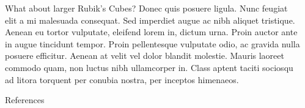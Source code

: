 \documentclass[final]{beamer}
\newlength{\sepwidth}
\newlength{\colwidth}
\newcommand{\separatorcolumn}{\begin{column}{\sepwidth}\end{column}}
\begin{document}
\begin{frame}[t]
\begin{columns}[t]
\begin{column}{\colwidth}
\begin{block}{What about larger Rubik's Cubes?}
    Donec quis posuere ligula. Nunc feugiat elit a mi malesuada consequat. Sed
    imperdiet augue ac nibh aliquet tristique. Aenean eu tortor vulputate,
    eleifend lorem in, dictum urna. Proin auctor ante in augue tincidunt
    tempor. Proin pellentesque vulputate odio, ac gravida nulla posuere
    efficitur. Aenean at velit vel dolor blandit molestie. Mauris laoreet
    commodo quam, non luctus nibh ullamcorper in. Class aptent taciti sociosqu
    ad litora torquent per conubia nostra, per inceptos himenaeos.



  \end{block}

  \begin{block}{References}

    \nocite{*}
    \footnotesize{}

  \end{block}

\end{column}

\separatorcolumn
\end{columns}
\end{frame}
\end{document}

